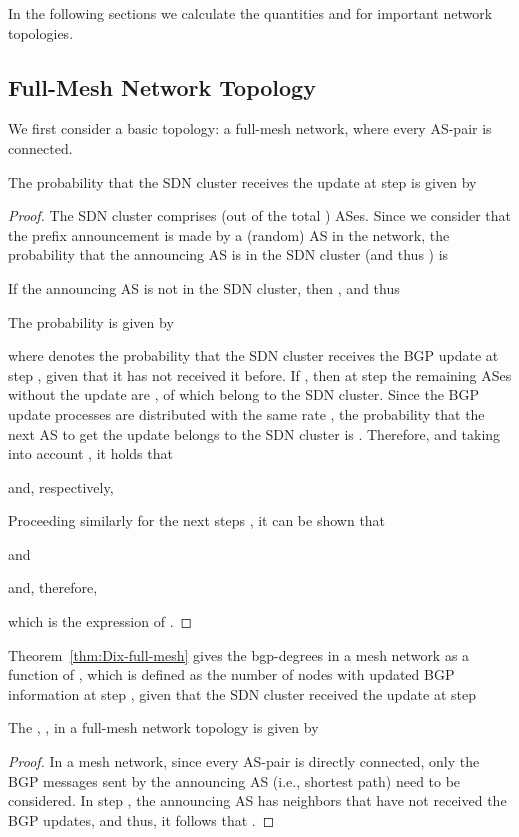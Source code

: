 In the following sections we calculate the quantities  and  for important network topologies.


\subsection{Full-Mesh Network Topology}
We first consider a basic topology: a full-mesh network, where every AS-pair is connected.

\begin{theorem}\label{thm:P-sdn}
The probability that the SDN cluster receives the update at step  is given by

\end{theorem}
\begin{proof}
The SDN cluster comprises  (out of the total ) ASes. Since we consider that the prefix announcement is made by a (random) AS in the network, the probability that the announcing AS is in the SDN cluster (and thus ) is 

If the announcing AS is not in the SDN cluster, then , and thus

The probability  is given by

where  denotes the probability that the SDN cluster receives the BGP update at step , given that it has not received it before. If , then at step  the remaining ASes  without the update are , of which  belong to the SDN cluster. Since the BGP update processes are distributed with the same rate , the probability that the next AS to get the update belongs to the SDN cluster is . Therefore, and taking into account , it holds that 

and, respectively,


Proceeding similarly for the next steps , it can be shown that

and

and, therefore,

which is the expression of .
\end{proof}


Theorem~\ref{thm:Dix-full-mesh} gives the bgp-degrees  in a mesh network as a function of , which is defined as the number of nodes with updated BGP information at step , given that the SDN cluster received the update at step 



\begin{theorem}\label{thm:Dix-full-mesh}
The \bgp , , in a full-mesh network topology is given by

\end{theorem}
\begin{proof}
In a mesh network, since every AS-pair is directly connected, only the BGP messages sent by the announcing AS (i.e., shortest path) need to be considered. In step , the announcing AS has  neighbors that have not received the BGP updates, and thus, it follows that .
\end{proof}



